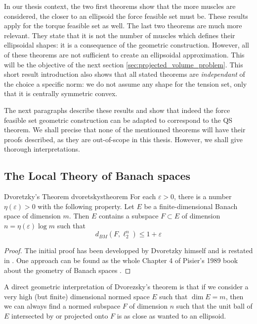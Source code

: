 In our thesis context, the two first theorems show that the more muscles are considered, the closer to an ellipsoid the force feasible set must be. These results apply for the torque feasible set as well. The last two theorems are much more relevant. They state that it is not the number of muscles which defines their ellipsoidal shapes: it is a consequence of the geometric construction. However, all of these theorems are not sufficient to create an ellipsoidal approximation. This will be the objective of the next section \ref{sec:projected_volume_problem}. This short result introduction also shows that all stated theorems are \emph{independant} of the choice a specific norm: we do not assume any shape for the tension set, only that it is centrally symmetric convex.

The next paragraphs describe these results and show that indeed the force feasible set geometric construction can be adapted to correspond to the QS theorem. We shall precise that none of the mentionned theorems will have their proofs described, as they are out-of-scope in this thesis. However, we shall give thorough interpretations.

\subsection{The Local Theory of Banach spaces}
\label{subsec:theoretical_results_local_theory}

\begin{theorembox}{Dvoretzky's Theorem \cite{milmanDvoretzkyTheoremThirtyYearsLater1992}}{dvoretskystheorem}
    For each $\varepsilon > 0$, there is a number $\eta(\varepsilon)>0$ with the following property. Let $E$ be a finite-dimensional Banach space of dimension $m$. Then $E$ contains a subspace $F\subset E$ of dimension $n=\eta(\varepsilon)\log m$ such that $$d_{BM}(F, \ell_2^n) \leq 1+\varepsilon$$
\end{theorembox}
\begin{proof}
    The initial proof has been developped by Dvoretzky himself and is restated in \cite{milmanDvoretzkyTheoremThirtyYearsLater1992}. One approach can be found as the whole Chapter 4 of Pisier's 1989 book about the geometry of Banach spaces \cite{pisierVolumeConvexBodies1989}.
\end{proof}

A direct geometric interpretation of Dvorezsky's theorem is that if we consider a very high (but finite) dimensional normed space $E$ such that $\dim E = m$, then we can always find a normed subspace $F$ of dimension $n$ such that the unit ball of $E$ intersected by or projected onto $F$ is as close as wanted to an ellipsoid. 

